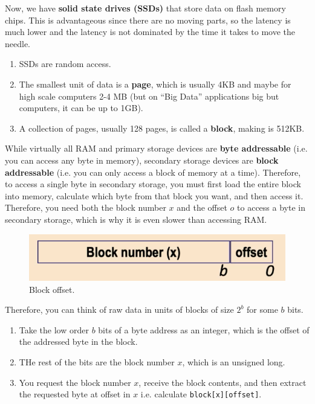   \begin{definition}
    Now, we have \textbf{solid state drives (SSDs)} that store data on flash memory chips. This is advantageous since there are no moving parts, so the latency is much lower and the latency is not dominated by the time it takes to move the needle. 
    \begin{enumerate}
      \item SSDs are random access. 
      \item The smallest unit of data is a \textbf{page}, which is usually 4KB and maybe for high scale computers 2-4 MB (but on ``Big Data'' applications big but computers, it can be up to 1GB). 
      \item A collection of pages, usually 128 pages, is called a \textbf{block}, making is 512KB. 
    \end{enumerate}
  \end{definition}

  While virtually all RAM and primary storage devices are \textbf{byte addressable} (i.e. you can access any byte in memory), secondary storage devices are \textbf{block addressable} (i.e. you can only access a block of memory at a time). Therefore, to access a single byte in secondary storage, you must first load the entire block into memory, calculate which byte from that block you want, and then access it. Therefore, you need both the block number $x$ and the offset $o$ to access a byte in secondary storage, which is why it is even slower than accessing RAM. 

  \begin{figure}[H]
    \centering 
    \includegraphics[scale=0.4]{img/block_offset.png}
    \caption{Block offset.} 
    \label{fig:block_offset}
  \end{figure}

  Therefore, you can think of raw data in units of blocks of size $2^b$ for some $b$ bits. 
  \begin{enumerate}
    \item Take the low order $b$ bits of a byte address as an integer, which is the offset of the addressed byte in the block. 
    \item THe rest of the bits are the block number $x$, which is an unsigned long. 
    \item You request the block number $x$, receive the block contents, and then extract the requested byte at offset in $x$ i.e. calculate \texttt{block[x][offset]}. 
  \end{enumerate}

